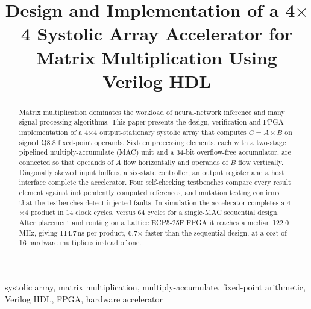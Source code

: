 \documentclass[conference]{IEEEtran}
\begin{document}
\title{Design and Implementation of a 4$\times$4 Systolic Array Accelerator for Matrix Multiplication Using Verilog HDL}

\author{
}

\maketitle

\begin{abstract}
Matrix multiplication dominates the workload of neural-network inference and many signal-processing algorithms. This paper presents the design, verification and FPGA implementation of a 4$\times$4 output-stationary systolic array that computes $C = A \times B$ on signed Q8.8 fixed-point operands. Sixteen processing elements, each with a two-stage pipelined multiply-accumulate (MAC) unit and a 34-bit overflow-free accumulator, are connected so that operands of $A$ flow horizontally and operands of $B$ flow vertically. Diagonally skewed input buffers, a six-state controller, an output register and a host interface complete the accelerator. Four self-checking testbenches compare every result element against independently computed references, and mutation testing confirms that the testbenches detect injected faults. In simulation the accelerator completes a 4$\times$4 product in 14 clock cycles, versus 64 cycles for a single-MAC sequential design. After placement and routing on a Lattice ECP5-25F FPGA it reaches a median 122.0\,MHz, giving 114.7\,ns per product, 6.7$\times$ faster than the sequential design, at a cost of 16 hardware multipliers instead of one.
\end{abstract}

\begin{IEEEkeywords}
systolic array, matrix multiplication, multiply-accumulate, fixed-point arithmetic, Verilog HDL, FPGA, hardware accelerator
\end{IEEEkeywords}
\end{document}
